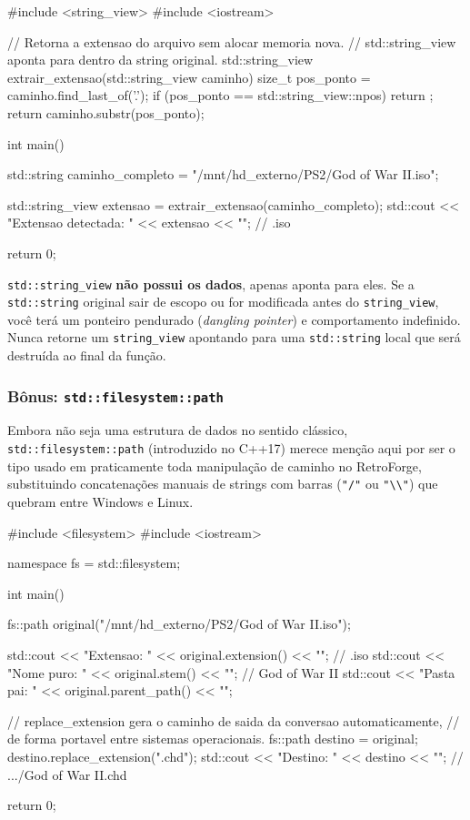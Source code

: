 \begin{CaixaCodigo}
#include <string_view>
#include <iostream>

// Retorna a extensao do arquivo sem alocar memoria nova.
// std::string_view aponta para dentro da string original.
std::string_view extrair_extensao(std::string_view caminho) {
    size_t pos_ponto = caminho.find_last_of('.');
    if (pos_ponto == std::string_view::npos) {
        return {};
    }
    return caminho.substr(pos_ponto);
}

int main() {
    std::string caminho_completo = "/mnt/hd_externo/PS2/God of War II.iso";

    std::string_view extensao = extrair_extensao(caminho_completo);
    std::cout << "Extensao detectada: " << extensao << "\n"; // .iso

    return 0;
}
\end{CaixaCodigo}

\begin{CaixaAlerta}
\texttt{std::string\_view} \textbf{não possui os dados}, apenas aponta para eles. Se a \texttt{std::string} original sair de escopo ou for modificada antes do \texttt{string\_view}, você terá um ponteiro pendurado (\textit{dangling pointer}) e comportamento indefinido. Nunca retorne um \texttt{string\_view} apontando para uma \texttt{std::string} local que será destruída ao final da função.
\end{CaixaAlerta}

\subsubsection{Bônus: \texttt{std::filesystem::path}}

Embora não seja uma estrutura de dados no sentido clássico, \texttt{std::filesystem::path} (introduzido no C++17) merece menção aqui por ser o tipo usado em praticamente toda manipulação de caminho no RetroForge, substituindo concatenações manuais de strings com barras (\texttt{"/"} ou \texttt{"\textbackslash\textbackslash"}) que quebram entre Windows e Linux.

\begin{CaixaCodigo}
#include <filesystem>
#include <iostream>

namespace fs = std::filesystem;

int main() {
    fs::path original("/mnt/hd_externo/PS2/God of War II.iso");

    std::cout << "Extensao:  " << original.extension()  << "\n"; // .iso
    std::cout << "Nome puro: " << original.stem()        << "\n"; // God of War II
    std::cout << "Pasta pai: " << original.parent_path()  << "\n";

    // replace_extension gera o caminho de saida da conversao automaticamente,
    // de forma portavel entre sistemas operacionais.
    fs::path destino = original;
    destino.replace_extension(".chd");
    std::cout << "Destino:   " << destino << "\n"; // .../God of War II.chd

    return 0;
}
\end{CaixaCodigo}

